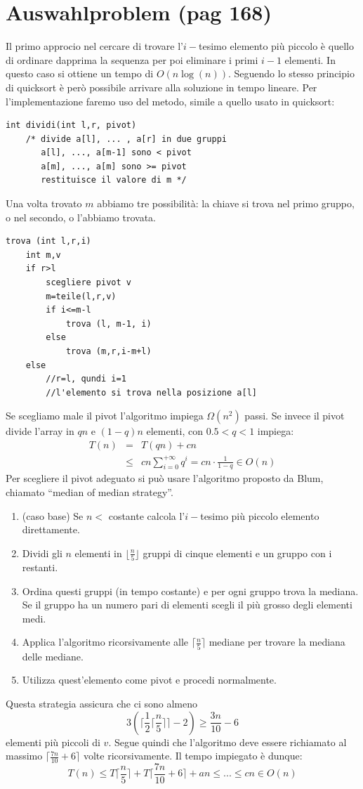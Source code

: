 \documentclass[a4paper]{book}
\newcommand{\lstIndent}{4}
\begin{document}
\section{Auswahlproblem (pag 168)}
Il primo approcio nel cercare di trovare l'$i-$tesimo elemento più piccolo è quello di ordinare dapprima la sequenza per poi eliminare i primi $i-1$ elementi. In questo caso si ottiene un tempo di $O(n \log (n))$. Seguendo lo stesso principio di quicksort è però possibile arrivare alla soluzione in tempo lineare. Per l'implementazione faremo uso del metodo, simile a quello usato in quicksort:
\begin{lstlisting}[tabsize=\lstIndent]
int dividi(int l,r, pivot)
	/* divide a[l], ... , a[r] in due gruppi
	   a[l], ..., a[m-1] sono < pivot
	   a[m], ..., a[m] sono >= pivot
	   restituisce il valore di m */
\end{lstlisting}
Una volta trovato $m$ abbiamo tre possibilità: la chiave si trova nel primo gruppo, o nel secondo, o l'abbiamo trovata.
\begin{lstlisting}[tabsize=\lstIndent]
trova (int l,r,i)
	int m,v
	if r>l
		scegliere pivot v
		m=teile(l,r,v)
		if i<=m-l
			trova (l, m-1, i)
		else
			trova (m,r,i-m+l)
	else
		//r=l, qundi i=1
		//l'elemento si trova nella posizione a[l]	 			
\end{lstlisting}
Se scegliamo male il pivot l'algoritmo impiega $\Omega (n^2)$ passi. Se invece il pivot divide l'array in $qn$ e $(1-q)n$ elementi, con $0.5<q<1$ impiega:
\begin{eqnarray}
T(n) &=& T(qn)+cn \nonumber \\
& \leq & cn \sum_{i=0}^{+\infty} q^i = cn \cdot\frac{1}{1-q} \in O(n)
\end{eqnarray}
Per scegliere il pivot adeguato si può usare l'algoritmo proposto da Blum, chiamato ``median of median strategy''.
\begin{enumerate}
\item (caso base) Se $n<$ costante calcola l'$i-$tesimo più piccolo elemento direttamente.
\item Dividi gli $n$ elementi in $\lfloor \frac{n}{5} \rfloor$ gruppi di cinque elementi e un gruppo con i restanti. 
\item Ordina questi gruppi (in tempo costante) e per ogni gruppo trova la mediana. Se il gruppo ha un numero pari di elementi scegli il più grosso degli elementi medi. 
\item Applica l'algoritmo ricorsivamente alle $\lceil \frac{n}{5} \rceil$ mediane per trovare la mediana delle mediane.
\item Utilizza quest'elemento come pivot e procedi normalmente.
\end{enumerate}
Questa strategia assicura che ci sono almeno 
$$ 3\left(\lceil \frac{1}{2} \lceil \frac{n}{5} \rceil \rceil -2\right) \geq \frac{3n}{10} -6$$
elementi più piccoli di $v$. Segue quindi che l'algoritmo deve essere richiamato al massimo $ \lceil \frac{7n}{10} + 6 \rceil$ volte ricorsivamente. Il tempo impiegato è dunque:
$$ T(n) \leq T\lceil \frac{n}{5} \rceil +T \lceil \frac{7n}{10} +6 \rceil + an \leq ... \leq cn \in O(n) $$
\end{document}
